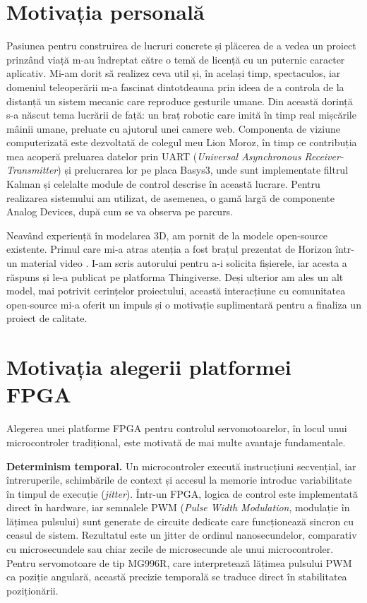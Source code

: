 \section{Motivația personală}
\label{sec:intro-motivatie-personala}

Pasiunea pentru construirea de lucruri concrete și plăcerea de a vedea un
proiect prinzând viață m-au îndreptat către o temă de licență cu un puternic
caracter aplicativ. Mi-am dorit să realizez ceva util
și, în același timp, spectaculos, iar domeniul teleoperării m-a fascinat
dintotdeauna prin ideea de a controla de la distanță un sistem mecanic care
reproduce gesturile umane. Din această dorință s-a născut tema lucrării de
față: un braț robotic care imită în timp real mișcările mâinii umane,
preluate cu ajutorul unei camere web. Componenta de viziune computerizată
este dezvoltată de colegul meu Lion Moroz, în timp ce contribuția mea
acoperă preluarea datelor prin UART (\textit{Universal Asynchronous
Receiver-Transmitter}) și prelucrarea lor pe placa Basys3, unde
sunt implementate filtrul Kalman și celelalte module de control descrise în
această lucrare. Pentru realizarea sistemului am utilizat, de asemenea, o
gamă largă de componente Analog Devices, după cum se va observa pe parcurs.

Neavând experiență în modelarea 3D, am pornit de la modele open-source
existente. Primul care mi-a atras atenția a fost brațul prezentat de Horizon
într-un material video \cite{horizon_hand}. I-am scris autorului pentru a-i
solicita fișierele, iar acesta a răspuns și le-a publicat pe platforma
Thingiverse. Deși ulterior am ales un alt model, mai potrivit cerințelor
proiectului, această interacțiune cu comunitatea open-source mi-a oferit un
impuls și o motivație suplimentară pentru a finaliza un proiect de calitate.

\section{Motivația alegerii platformei FPGA}
\label{sec:intro-fpga}

Alegerea unei platforme FPGA pentru
controlul servomotoarelor, în locul unui microcontroler tradițional, este
motivată de mai multe avantaje fundamentale.

\textbf{Determinism temporal.} Un microcontroler execută instrucțiuni secvențial,
iar întreruperile, schimbările de context și accesul la memorie introduc
variabilitate în timpul de execuție (\textit{jitter}). Într-un FPGA, logica de
control este implementată direct în hardware, iar semnalele PWM (\textit{Pulse
Width Modulation}, modulație în lățimea pulsului) sunt generate de
circuite dedicate care funcționează sincron cu ceasul de sistem. Rezultatul este
un jitter de ordinul nanosecundelor, comparativ cu microsecundele sau chiar
zecile de microsecunde ale unui microcontroler. Pentru servomotoare de tip
MG996R, care interpretează lățimea pulsului PWM ca poziție angulară, această
precizie temporală se traduce direct în stabilitatea poziționării.

